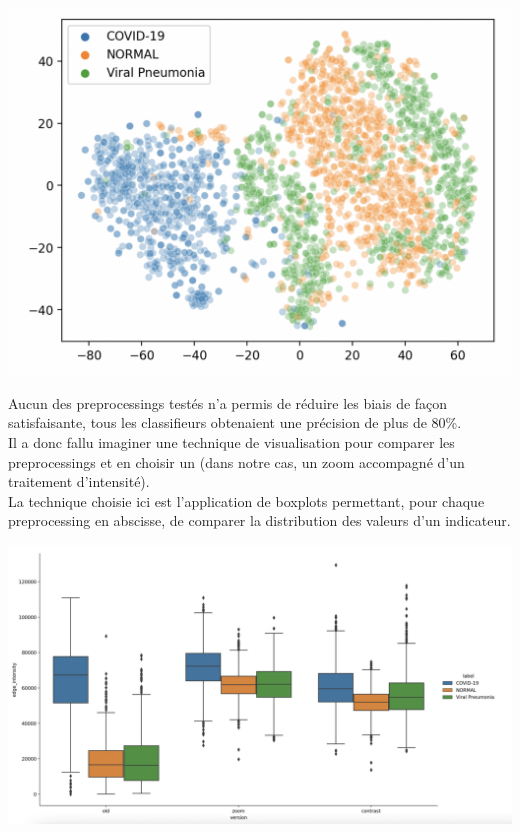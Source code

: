 \documentclass{article}
\begin{document}
	\begin{center}
	\includegraphics[scale=0.5]{tsne.png}
	\end{center}
	
	Aucun des preprocessings testés n'a permis de réduire les biais de façon satisfaisante, tous les classifieurs obtenaient une précision de plus de 80\%.\\
	Il a donc fallu imaginer une technique de visualisation pour comparer les preprocessings et en choisir un (dans notre cas, un zoom accompagné d'un traitement d'intensité).\\
	La technique choisie ici est l'application de boxplots permettant, pour chaque preprocessing en abscisse, de comparer la distribution des valeurs d'un indicateur.
	
	\begin{center}
	\includegraphics[scale=0.3]{preprocess_comp.png}
	\end{center}
	
\end{document}
